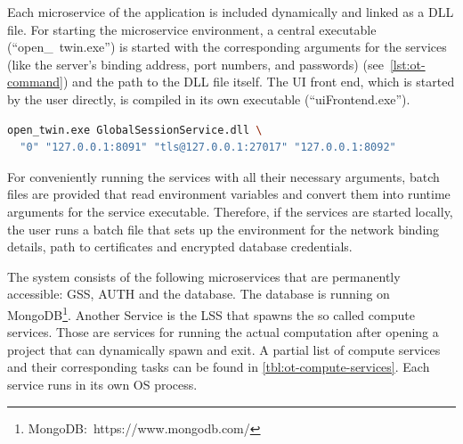 Each microservice of the application is included dynamically and linked as a \ac{DLL} file. For starting the microservice environment, a central executable (\enquote{open\_\ twin.exe}) is started with the corresponding arguments for the services (like the server's binding address, port numbers, and passwords) (see~\autoref{lst:ot-command}) and the path to the \ac{DLL} file itself. The \ac{UI} front end, which is started by the user directly, is compiled in its own executable (\enquote{uiFrontend.exe}).

\begin{lstlisting}[language=sh, caption={Command line of Open Twin Service start}, label=lst:ot-command]
open_twin.exe GlobalSessionService.dll \
  "0" "127.0.0.1:8091" "tls@127.0.0.1:27017" "127.0.0.1:8092"
\end{lstlisting}

For conveniently running the services with all their necessary arguments, batch files are provided that read environment variables and convert them into runtime arguments for the service executable. Therefore, if the services are started locally, the user runs a batch file that sets up the environment for the network binding details, path to certificates and encrypted database credentials.

The system consists of the following microservices that are permanently accessible: \acf{GSS}, \acf{AUTH} and the database. The database is running on MongoDB\footnote{MongoDB:~https://www.mongodb.com/}. Another Service is the \acf{LSS} that spawns the so called compute services. Those are services for running the actual computation after opening a project that can dynamically spawn and exit. A partial list of compute services and their corresponding tasks can be found in \autoref{tbl:ot-compute-services}.
Each service runs in its own \ac{OS} process.

